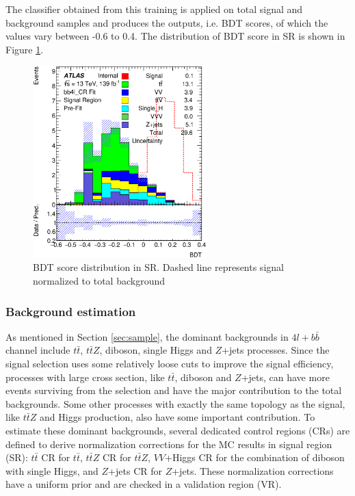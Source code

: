The classifier obtained from this training is applied on total signal and background samples and produces the outputs, i.e. BDT scores, of which the values vary between -0.6 to 0.4. The distribution of BDT score in SR is shown in Figure \ref{Fig.SR pre-fit}. 

\begin{figure}[H]
	\caption{BDT score distribution in SR. Dashed line represents signal normalized to total background}
	\label{Fig.SR pre-fit}
	\centering
	\includegraphics[width=0.6\textwidth]{figures/4lbb/Plots/SR.eps}
\end{figure}

\subsubsection{Background estimation}
\label{subsubsec:bkg}

As mentioned in Section \ref{sec:sample}, the dominant backgrounds in $4l+b\bar{b}$ channel include $t\bar{t}$, $t\bar{t}Z$, diboson, single Higgs and $Z$+jets processes. Since the signal selection uses some relatively loose cuts to improve the signal efficiency, processes with large cross section, like $t\bar{t}$, diboson and $Z$+jets, can have more events surviving from the selection and have the major contribution to the total backgrounds. Some other processes with exactly the same topology as the signal, like $t\bar{t}Z$ and Higgs production, also have some important contribution. To estimate these dominant backgrounds, several dedicated control regions (CRs) are defined to derive normalization corrections for the MC results in signal region (SR): $t\bar{t}$ CR for $t\bar{t}$, $t\bar{t}Z$ CR for $t\bar{t}Z$, $VV$+Higgs CR for the combination of diboson with single Higgs, and $Z$+jets CR for $Z$+jets. These normalization corrections have a uniform prior and are checked in a validation region (VR).

